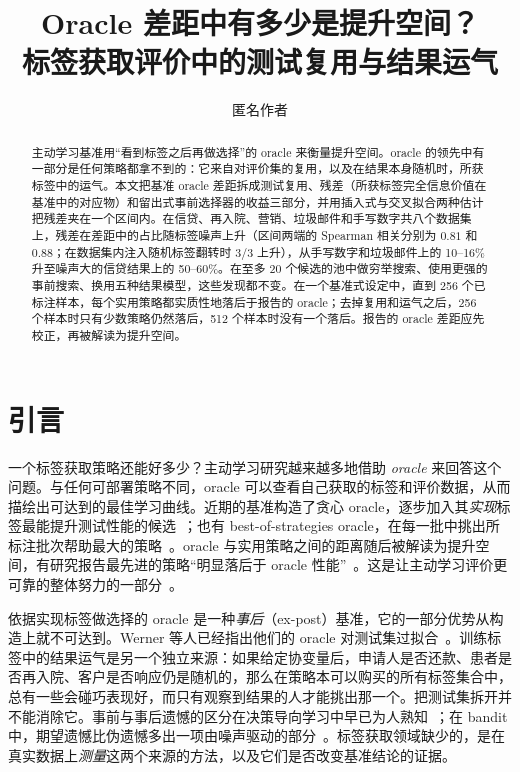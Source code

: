 \documentclass[runningheads]{llncs}
\begin{document}
\title{Oracle 差距中有多少是提升空间？\\标签获取评价中的测试复用与结果运气}
\author{匿名作者}
\maketitle

\begin{abstract}
主动学习基准用“看到标签之后再做选择”的 oracle 来衡量提升空间。oracle 的领先中有一部分是任何策略都拿不到的：它来自对评价集的复用，以及在结果本身随机时，所获标签中的运气。本文把基准 oracle 差距拆成测试复用、残差（所获标签完全信息价值在基准中的对应物）和留出式事前选择器的收益三部分，并用插入式与交叉拟合两种估计把残差夹在一个区间内。在信贷、再入院、营销、垃圾邮件和手写数字共八个数据集上，残差在差距中的占比随标签噪声上升（区间两端的 Spearman 相关分别为 $0.81$ 和 $0.88$；在数据集内注入随机标签翻转时 3/3 上升），从手写数字和垃圾邮件上的 10--16\% 升至噪声大的信贷结果上的 50--60\%。在至多 20 个候选的池中做穷举搜索、使用更强的事前搜索、换用五种结果模型，这些发现都不变。在一个基准式设定中，直到 256 个已标注样本，每个实用策略都实质性地落后于报告的 oracle；去掉复用和运气之后，256 个样本时只有少数策略仍然落后，512 个样本时没有一个落后。报告的 oracle 差距应先校正，再被解读为提升空间。
\end{abstract}

\section{引言}
\label{sec:intro}
一个标签获取策略还能好多少？主动学习研究越来越多地借助 \emph{oracle} 来回答这个问题。与任何可部署策略不同，oracle 可以查看自己获取的标签和评价数据，从而描绘出可达到的最佳学习曲线。近期的基准构造了贪心 oracle，逐步加入其\emph{实现}标签最能提升测试性能的候选~\cite{werner2023comparable,werner2024cdalbench}；也有 best-of-strategies oracle，在每一批中挑出所标注批次帮助最大的策略~\cite{huseljic2026boss}。oracle 与实用策略之间的距离随后被解读为提升空间，有研究报告最先进的策略“明显落后于 oracle 性能”~\cite{huseljic2026boss}。这是让主动学习评价更可靠的整体努力的一部分~\cite{luth2023navigating,ji2023randomness}。

依据实现标签做选择的 oracle 是一种\emph{事后}（ex-post）基准，它的一部分优势从构造上就不可达到。Werner 等人已经指出他们的 oracle 对测试集过拟合~\cite{werner2023comparable}。训练标签中的结果运气是另一个独立来源：如果给定协变量后，申请人是否还款、患者是否再入院、客户是否响应仍是随机的，那么在策略本可以购买的所有标签集合中，总有一些会碰巧表现好，而只有观察到结果的人才能挑出那一个。把测试集拆开并不能消除它。事前与事后遗憾的区分在决策导向学习中早已为人熟知~\cite{schutte2023robust}；在 bandit 中，期望遗憾比伪遗憾多出一项由噪声驱动的部分~\cite{bubeck2012regret,audibert2010regret}。标签获取领域缺少的，是在真实数据上\emph{测量}这两个来源的方法，以及它们是否改变基准结论的证据。
\end{document}
